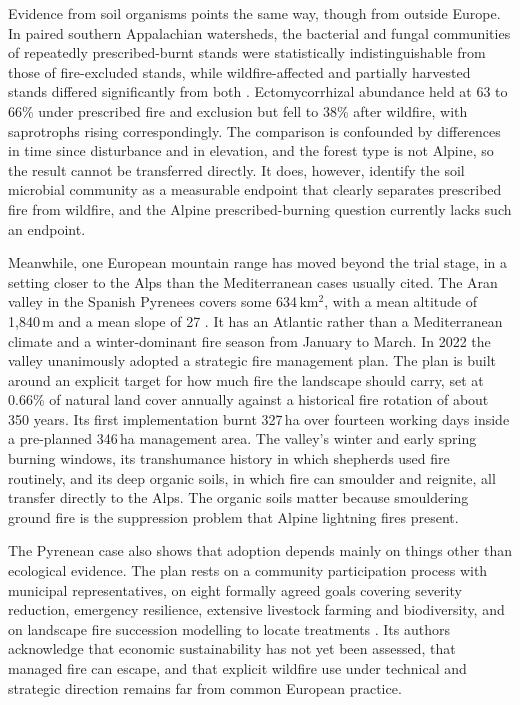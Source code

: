 \documentclass[11pt,a4paper]{article}
\begin{document}
Evidence from soil organisms points the same way, though from outside Europe. In paired southern Appalachian watersheds, the bacterial and fungal communities of repeatedly prescribed-burnt stands were statistically indistinguishable from those of fire-excluded stands, while wildfire-affected and partially harvested stands differed significantly from both \citep{snyder_taxonomic_2026}. Ectomycorrhizal abundance held at 63 to 66\% under prescribed fire and exclusion but fell to 38\% after wildfire, with saprotrophs rising correspondingly. The comparison is confounded by differences in time since disturbance and in elevation, and the forest type is not Alpine, so the result cannot be transferred directly. It does, however, identify the soil microbial community as a measurable endpoint that clearly separates prescribed fire from wildfire, and the Alpine prescribed-burning question currently lacks such an endpoint.

Meanwhile, one European mountain range has moved beyond the trial stage, in a setting closer to the Alps than the Mediterranean cases usually cited. The Aran valley in the Spanish Pyrenees covers some 634\,km$^2$, with a mean altitude of 1{,}840\,m and a mean slope of 27\degree{} \citep{oliveres_path_2025}. It has an Atlantic rather than a Mediterranean climate and a winter-dominant fire season from January to March. In 2022 the valley unanimously adopted a strategic fire management plan. The plan is built around an explicit target for how much fire the landscape should carry, set at 0.66\% of natural land cover annually against a historical fire rotation of about 350 years. Its first implementation burnt 327\,ha over fourteen working days inside a pre-planned 346\,ha management area. The valley's winter and early spring burning windows, its transhumance history in which shepherds used fire routinely, and its deep organic soils, in which fire can smoulder and reignite, all transfer directly to the Alps. The organic soils matter because smouldering ground fire is the suppression problem that Alpine lightning fires present.

The Pyrenean case also shows that adoption depends mainly on things other than ecological evidence. The plan rests on a community participation process with municipal representatives, on eight formally agreed goals covering severity reduction, emergency resilience, extensive livestock farming and biodiversity, and on landscape fire succession modelling to locate treatments \citep{oliveres_path_2025}. Its authors acknowledge that economic sustainability has not yet been assessed, that managed fire can escape, and that explicit wildfire use under technical and strategic direction remains far from common European practice.
\end{document}
